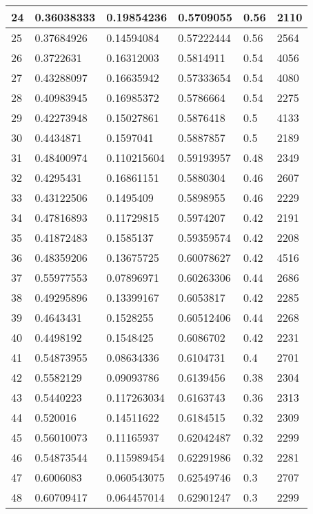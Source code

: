 \begin{longtable}{|l|l|l|l|l|l|}
24 & 0.36038333 & 0.19854236 & 0.5709055 & 0.56 & 2110 \\ \hline 
25 & 0.37684926 & 0.14594084 & 0.57222444 & 0.56 & 2564 \\ \hline 
26 & 0.3722631 & 0.16312003 & 0.5814911 & 0.54 & 4056 \\ \hline 
27 & 0.43288097 & 0.16635942 & 0.57333654 & 0.54 & 4080 \\ \hline 
28 & 0.40983945 & 0.16985372 & 0.5786664 & 0.54 & 2275 \\ \hline 
29 & 0.42273948 & 0.15027861 & 0.5876418 & 0.5 & 4133 \\ \hline 
30 & 0.4434871 & 0.1597041 & 0.5887857 & 0.5 & 2189 \\ \hline 
31 & 0.48400974 & 0.110215604 & 0.59193957 & 0.48 & 2349 \\ \hline 
32 & 0.4295431 & 0.16861151 & 0.5880304 & 0.46 & 2607 \\ \hline 
33 & 0.43122506 & 0.1495409 & 0.5898955 & 0.46 & 2229 \\ \hline 
34 & 0.47816893 & 0.11729815 & 0.5974207 & 0.42 & 2191 \\ \hline 
35 & 0.41872483 & 0.1585137 & 0.59359574 & 0.42 & 2208 \\ \hline 
36 & 0.48359206 & 0.13675725 & 0.60078627 & 0.42 & 4516 \\ \hline 
37 & 0.55977553 & 0.07896971 & 0.60263306 & 0.44 & 2686 \\ \hline 
38 & 0.49295896 & 0.13399167 & 0.6053817 & 0.42 & 2285 \\ \hline 
39 & 0.4643431 & 0.1528255 & 0.60512406 & 0.44 & 2268 \\ \hline 
40 & 0.4498192 & 0.1548425 & 0.6086702 & 0.42 & 2231 \\ \hline 
41 & 0.54873955 & 0.08634336 & 0.6104731 & 0.4 & 2701 \\ \hline 
42 & 0.5582129 & 0.09093786 & 0.6139456 & 0.38 & 2304 \\ \hline 
43 & 0.5440223 & 0.117263034 & 0.6163743 & 0.36 & 2313 \\ \hline 
44 & 0.520016 & 0.14511622 & 0.6184515 & 0.32 & 2309 \\ \hline 
45 & 0.56010073 & 0.11165937 & 0.62042487 & 0.32 & 2299 \\ \hline 
46 & 0.54873544 & 0.115989454 & 0.62291986 & 0.32 & 2281 \\ \hline 
47 & 0.6006083 & 0.060543075 & 0.62549746 & 0.3 & 2707 \\ \hline 
48 & 0.60709417 & 0.064457014 & 0.62901247 & 0.3 & 2299 \\ \hline 

\end{longtable}

